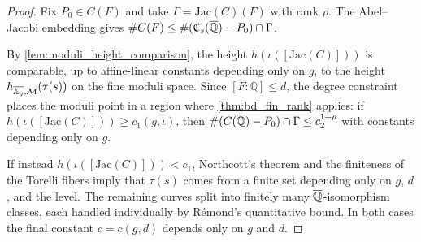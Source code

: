 \begin{proof}
  Fix \(P_0 \in C(F)\) and take \(\Gamma = \mathrm{Jac}(C)(F)\) with rank
  \(\rho\). The Abel--Jacobi embedding gives \(\#C(F) \le \#(\mathfrak{C}_s(\overline{\mathbb{Q}})
  - P_0) \cap \Gamma\).

  By \cref{lem:moduli_height_comparison}, the height \(h(\iota([\mathrm{Jac}(C)]))\)
  is comparable, up to affine-linear constants depending only on \(g\), to the
  height \(h_{\overline{\mathbb{A}_g},\mathcal{M}}(\tau(s))\) on the fine moduli space.
  Since \([F:\mathbb{Q}] \le d\), the degree constraint places the moduli point
  in a region where \cref{thm:bd_fin_rank} applies: if
  \(h(\iota([\mathrm{Jac}(C)])) \ge c_1(g,\iota)\), then
  \(\#(C(\overline{\mathbb{Q}}) - P_0) \cap \Gamma \le c_2^{1+\rho}\) with constants
  depending only on \(g\).

  If instead \(h(\iota([\mathrm{Jac}(C)])) < c_1\), Northcott's theorem and
  the finiteness of the Torelli fibers imply that \(\tau(s)\) comes from a
  finite set depending only on \(g\), \(d\), and the level. The remaining curves
  split into finitely many \(\overline{\mathbb{Q}}\)-isomorphism classes, each handled
  individually by Rémond's quantitative bound. In both cases the final constant
  \(c = c(g,d)\) depends only on \(g\) and \(d\).
\end{proof}

